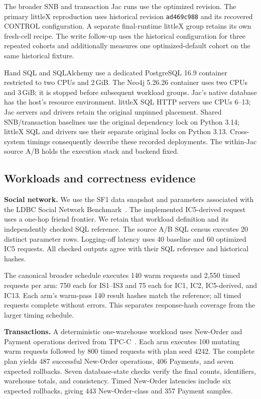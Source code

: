 \documentclass[sigconf,nonacm]{acmart}
\newcommand{\code}[1]{\texttt{#1}}
\begin{document}
The broader SNB and transaction Jac runs use the optimized revision. The
primary littleX reproduction uses historical revision \code{ad469c988} and
its recovered CONTROL configuration. A separate final-runtime littleX group
retains its own fresh-cell recipe. The write follow-up uses the historical
configuration for three repeated cohorts and additionally measures one
optimized-default cohort on the same historical fixture.

Hand SQL and SQLAlchemy use a dedicated PostgreSQL 16.9 container restricted
to two CPUs and 2\,GiB. The Neo4j 5.26.26 container uses two CPUs and 3\,GiB;
it is stopped before subsequent workload groups. Jac's native database has
the host's resource environment. littleX SQL HTTP servers use CPUs 6--13;
Jac servers and drivers retain the original unpinned placement. Shared
SNB/transaction baselines use the original dependency lock on Python 3.14;
littleX SQL and drivers use their separate original locks on Python 3.13.
Cross-system timings consequently describe these recorded deployments. The
within-Jac source A/B holds the execution stack and backend fixed.

\subsection{Workloads and correctness evidence}
\textbf{Social network.} We use the SF1 data snapshot and parameters associated
with the LDBC Social Network Benchmark~\citep{ldbc}. The implemented IC5-derived
request uses a one-hop friend frontier. We retain that workload definition and
its independently checked SQL reference. The source A/B SQL census executes
20 distinct parameter rows. Logging-off latency uses 40 baseline and 60
optimized IC5 requests. All checked outputs agree with their SQL reference and
historical hashes.

The canonical broader schedule executes 140 warm requests and 2,550 timed
requests per arm: 750 each for IS1--IS3 and 75 each for IC1, IC2, IC5-derived,
and IC13. Each arm's warm-pass 140 result hashes match the reference; all timed
requests complete without errors. This separates response-hash coverage from
the larger timing schedule.

\textbf{Transactions.} A deterministic one-warehouse workload uses New-Order
and Payment operations derived from TPC-C~\citep{tpcc}. Each arm executes
100 mutating warm requests followed by 800 timed requests with plan seed
4242. The complete plan yields 487 successful New-Order operations, 406
Payments, and seven expected rollbacks. Seven database-state checks verify the
final counts, identifiers, warehouse totals, and consistency. Timed New-Order
latencies include six expected rollbacks, giving 443 New-Order-class and
357 Payment samples.
\end{document}
